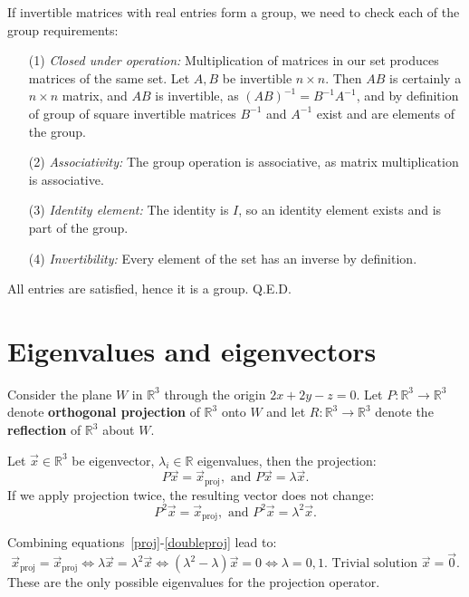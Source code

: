 \documentclass{article}
\begin{document}
If invertible matrices with real entries form a group, we need to check each of the group requirements:
\begin{itemize}
\item[(1)] \textit{Closed under operation:} Multiplication of matrices in our set produces matrices of the same set. Let $A, B$ be invertible $n\times n$. Then $A B$ is certainly a $n \times n$ matrix, and $A B$ is invertible, as $(A B)^{-1}=B^{-1} A^{-1}$, and by definition of group of square invertible matrices $B^{-1}$ and $A^{-1}$ exist and are elements of the group.
\item[(2)] \textit{Associativity: }The group operation is associative, as matrix multiplication is associative.
\item[(3)] \textit{Identity element: }The identity is $I$, so an identity element exists and is part of the group.
\item[(4)] \textit{Invertibility:} Every element of the set has an inverse by definition.
\end{itemize}

All entries are satisfied, hence it is a group. Q.E.D.

\section{Eigenvalues and eigenvectors}

Consider the plane $W$ in $\mathbb{R}^3$ through the origin $2x+2y-z=0$. Let $P:\mathbb{R}^3\to\mathbb{R}^3$ denote \textbf{orthogonal projection} of $\mathbb{R}^3$ onto $W$ and let $R:\mathbb{R}^3\to\mathbb{R}^3$ denote the \textbf{reflection} of $\mathbb{R}^3$ about $W$. 

Let $\vec{x}\in\mathbb{R}^3$ be eigenvector, $\lambda_i\in \mathbb{R}$ eigenvalues, then the projection:
\begin{equation}\label{proj}
	P\vec{x}=\vec{x}_{\operatorname{proj}},\text{ and }P\vec{x}=\lambda\vec{x}.
\end{equation}
If we apply projection twice, the resulting vector does not change:
\begin{equation}\label{doubleproj}
	P^2\vec{x}=\vec{x}_{\operatorname{proj}},\text{ and }P^2\vec{x}=\lambda^2\vec{x}	.
\end{equation}

Combining equations~\eqref{proj}-\eqref{doubleproj} lead to:
\begin{equation*}
	\vec{x}_{\operatorname{proj}}=\vec{x}_{\operatorname{proj}}\iff\lambda \vec{x}=\lambda^2\vec{x}\iff \left(\lambda^2-\lambda\right)\vec{x}=0\iff \lambda=0,1. \text{ Trivial solution }\vec{x}=\vec{0}.
\end{equation*}
These are the only possible eigenvalues for the projection operator. 
\end{document}
